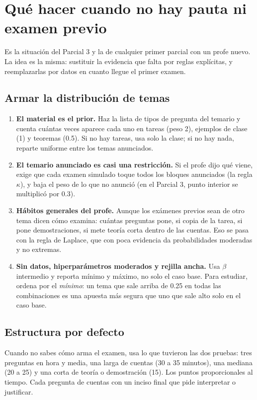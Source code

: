 \documentclass[11pt]{article}
\begin{document}
\section{Qué hacer cuando no hay pauta ni examen previo}

Es la situación del Parcial 3 y la de cualquier primer parcial con un profe nuevo. La idea es
la misma: sustituir la evidencia que falta por reglas explícitas, y reemplazarlas por datos en
cuanto llegue el primer examen.

\subsection{Armar la distribución de temas}
\begin{enumerate}
\item \textbf{El material es el prior.} Haz la lista de tipos de pregunta del temario y cuenta
cuántas veces aparece cada uno en tareas (peso 2), ejemplos de clase (1) y teoremas (0.5). Si
no hay tareas, usa solo la clase; si no hay nada, reparte uniforme entre los temas anunciados.
\item \textbf{El temario anunciado es casi una restricción.} Si el profe dijo qué viene, exige
que cada examen simulado toque todos los bloques anunciados (la regla $\kappa$), y baja el peso
de lo que no anunció (en el Parcial 3, punto interior se multiplicó por 0.3).
\item \textbf{Hábitos generales del profe.} Aunque los exámenes previos sean de otro tema
dicen cómo examina: cuántas preguntas pone, si copia de la tarea, si pone demostraciones, si
mete teoría corta dentro de las cuentas. Eso se pasa con la regla de Laplace, que con poca
evidencia da probabilidades moderadas y no extremas.
\item \textbf{Sin datos, hiperparámetros moderados y rejilla ancha.} Usa $\beta$ intermedio y
reporta mínimo y máximo, no solo el caso base. Para estudiar, ordena por el \emph{mínimo}: un
tema que sale arriba de 0.25 en todas las combinaciones es una apuesta más segura que uno que
sale alto solo en el caso base.
\end{enumerate}

\subsection{Estructura por defecto}
Cuando no sabes cómo arma el examen, usa lo que tuvieron las dos pruebas: tres preguntas en
hora y media, una larga de cuentas (30 a 35 minutos), una mediana (20 a 25) y una corta de
teoría o demostración (15). Los puntos proporcionales al tiempo. Cada pregunta de cuentas con
un inciso final que pide interpretar o justificar.
\end{document}
